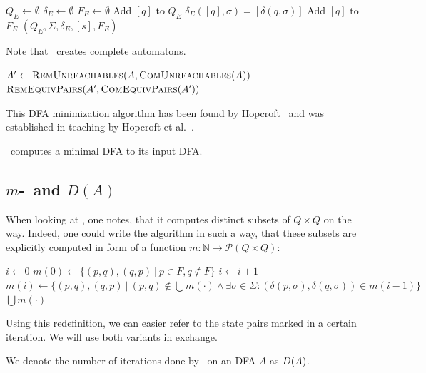 \begin{enumerate}
	\vspace{0.2cm}
	\begin{algorithmic}[1] \label{ch:1:minmerge}
		 
            \State $Q_E \gets \emptyset$
            \State $\delta_E \gets \emptyset$
            \State $F_E \gets \emptyset$
                \State Add $[q]$ to $Q_E$
                    \State $\delta_E([q], \sigma) = [\delta(q, \sigma)]$
                \EndFor
                    \State Add $[q]$ to $F_E$
                \EndIf
            \EndFor
			\State \Return $(Q_E, \Sigma, \delta_E, [s], F_E)$
		\EndFunction
	\end{algorithmic}
	Note that \RemEq\ creates complete automatons.
\end{enumerate}

\vspace{0.2cm}
\begin{algorithmic}[1] \label{ch:1:minalg}
    \State $A' \gets \textsc{RemUnreachables}(A, \textsc{ComUnreachables}(A))$
    \State \Return $\textsc{RemEquivPairs}(A', \textsc{ComEquivPairs}(A'))$
    \EndFunction
\end{algorithmic}
\vspace{0.2cm}
\noindent This DFA minimization algorithm has been found by Hopcroft~\cite{Hop71} and was established in teaching by Hopcroft et al.~\cite[pp. 154-164]{HMU01}.

\begin{theorem}\label{ch:1:min-alg-correct}\textnormal{\cite[pp. 162-164]{HMU01}}
	\MinAlg\ computes a minimal DFA to its input DFA.
\end{theorem}

\subsection{$m$-\CompDist\ and $D(A)$}

When looking at \CompDist, one notes, that it computes distinct subsets of $Q \times Q$ on the way. Indeed, one could write the algorithm in such a way, that these subsets are explicitly computed in form of a function $m\colon\mathbb{N}\to\mathcal{P}(Q\times Q)$:
\vspace{0.2cm}
\begin{algorithmic}[1] \label{ch:1:m-minmark}
	\State $i \gets 0$
	\State $m(0) \gets \{ (p,q), (q,p)\ |\ p \in F, q \notin F \}$
	\Do
		\State $i \gets i + 1$
		\State $m(i) \gets \{ (p,q), (q,p)\ |\ (p,q) \notin \bigcup{m(\cdot)} \land \exists \sigma \in \Sigma \colon (\delta(p,\sigma), \delta(q,\sigma)) \in m(i-1) \}$
	\State \Return $\bigcup{m(\cdot)}$
	\EndFunction
\end{algorithmic}
\vspace{0.2cm}
Using this redefinition, we can easier refer to the state pairs marked in a certain iteration. We will use both variants in exchange.
\begin{definition}
	We denote the number of iterations done by \CompDist\ on an DFA $A$ as $D(A)$.
\end{definition}

